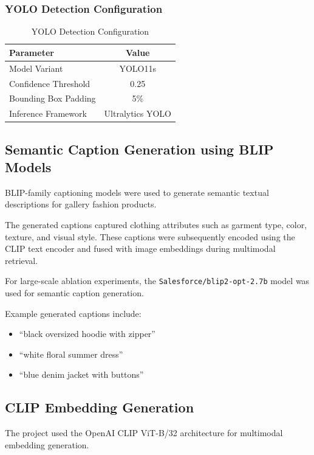 \documentclass[11pt,a4paper]{article}
\begin{document}
\subsubsection{YOLO Detection Configuration}

\begin{table}[H]
\centering
\caption{YOLO Detection Configuration}
\begin{tabular}{lc}
\toprule
Parameter & Value \\
\midrule
Model Variant & YOLO11s \\
Confidence Threshold & 0.25 \\
Bounding Box Padding & 5\% \\
Inference Framework & Ultralytics YOLO \\
\bottomrule
\end{tabular}
\end{table}

\subsection{Semantic Caption Generation using BLIP Models}

BLIP-family captioning models were used to generate semantic textual descriptions for gallery fashion products.

The generated captions captured clothing attributes such as garment type, color, texture, and visual style. These captions were subsequently encoded using the CLIP text encoder and fused with image embeddings during multimodal retrieval.

For large-scale ablation experiments, the \texttt{Salesforce/blip2-opt-2.7b} model was used for semantic caption generation.

Example generated captions include:
\begin{itemize}
    \item ``black oversized hoodie with zipper''
    \item ``white floral summer dress''
    \item ``blue denim jacket with buttons''
\end{itemize}

\subsection{CLIP Embedding Generation}

The project used the OpenAI CLIP ViT-B/32 architecture for multimodal embedding generation.
\end{document}
